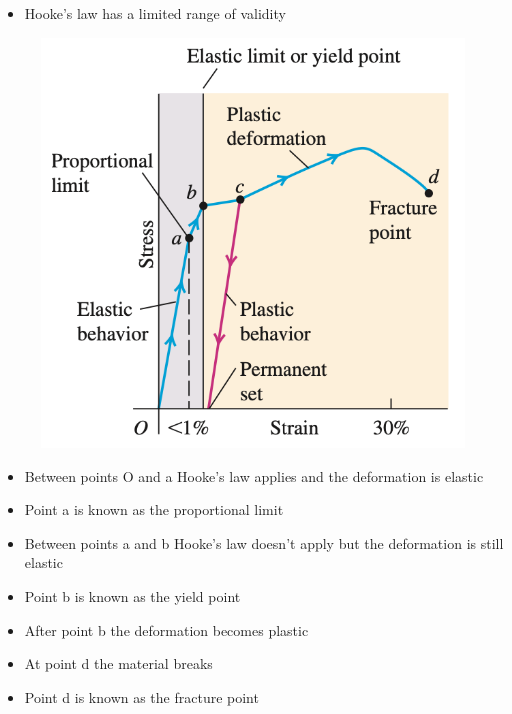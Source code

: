 \documentclass{article}
\begin{document}
\begin{itemize}
  \item Hooke's law has a limited range of validity
\end{itemize}

\begin{figure}[H]
  \centering
  \includegraphics[scale=0.5]{stress-strain}
\end{figure}

\begin{itemize}
  \item Between points O and a Hooke's law applies and the deformation is elastic

  \item Point a is known as the proportional limit

  \item Between points a and b Hooke's law doesn't apply but the deformation is still elastic

  \item Point b is known as the yield point

  \item After point b the deformation becomes plastic

  \item At point d the material breaks

  \item Point d is known as the fracture point
\end{itemize}
\end{document}
